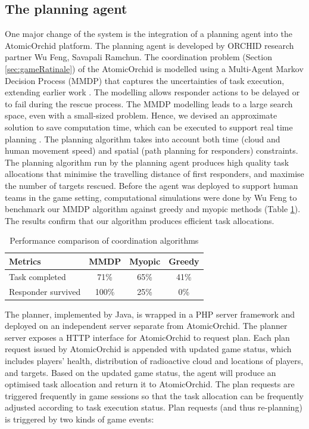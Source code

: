 \subsection{The planning agent}\label{sec:studyoneagent}
One major change of the system is the integration of a planning agent into the AtomicOrchid platform. The planning agent is developed by ORCHID research partner Wu Feng, Savapali Ramchun. The coordination problem (Section \ref{sec:gameRatinale}) of the AtomicOrchid is modelled using a Multi-Agent Markov Decision Process (MMDP) that captures the uncertainties of task execution, extending earlier work \cite{Ramchurn2010}. The modelling allows responder actions to be delayed or to fail during the rescue process. The MMDP modelling leads to a large search space, even with a small-sized problem. Hence, we devised an approximate solution to save computation time, which can be executed to support real time planning \cite{Wu2015}. The planning algorithm takes into account both time (cloud and human movement speed) and spatial (path planning for responders) constraints. The planning algorithm run by the planning agent produces high quality task allocations that minimise the travelling distance of first responders, and maximise the number of targets rescued. Before the agent was deployed to support human teams in the game setting, computational simulations were done by Wu Feng to benchmark our MMDP algorithm against greedy and myopic methods (Table  \ref{tab:alg}). The results confirm that our algorithm produces efficient task allocations.\\

\begin{table}[h]
\footnotesize
\centering
\begin{tabular}{l|ccc}
Metrics            & \multicolumn{1}{l}{MMDP} & \multicolumn{1}{l}{Myopic} & \multicolumn{1}{l}{Greedy} \\ \hline
Task completed     & 71\%                     & 65\%                       & 41\%                       \\
Responder survived & 100\%                    & 25\%                       & 0\%                       
\end{tabular}
\caption{Performance comparison of coordination algorithms}
\label{tab:alg}
\end{table}

The planner, implemented by Java, is wrapped in a PHP server framework and deployed on an independent server separate from AtomicOrchid. The planner server exposes a HTTP interface for AtomicOrchid to request plan. Each plan request issued by AtomicOrchid is appended with updated game status, which includes players' health, distribution of radioactive cloud and locations of players, and targets. Based on the updated game status, the agent will produce an optimised task allocation and return it to AtomicOrchid. The plan requests are triggered frequently in game sessions so that the task allocation can be frequently adjusted according to task execution status. Plan requests (and thus re-planning) is triggered by two kinds of game events:\\



